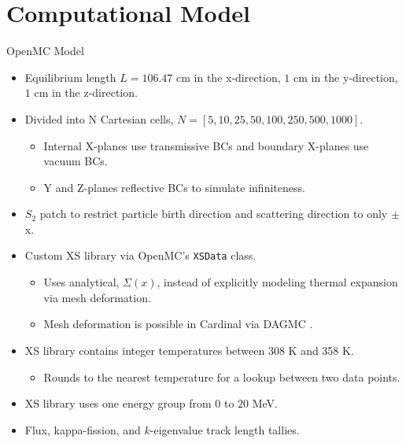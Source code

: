 \documentclass[9pt,t]{beamer}
\begin{document}
\section{Computational Model}
\begin{frame}{OpenMC Model}
    \pause
    \begin{itemize}
        \item <2-> Equilibrium length $L=106.47$ cm in the x-direction, $1$ cm in the y-direction, $1$ cm in the z-direction.
        \item <3-> Divided into N Cartesian cells, $N=[5, 10, 25, 50, 100, 250, 500, 1000]$.
        \begin{itemize}
            \item <4-> Internal X-planes use transmissive BCs and boundary X-planes use vacuum BCs.
            \item <5-> Y and Z-planes reflective BCs to simulate infiniteness.
        \end{itemize}
        \item <6-> $S_{2}$ patch to restrict particle birth direction and scattering direction to only $\pm$x.
        \item <7-> Custom XS library via OpenMC's \texttt{XSData} class.
        \begin{itemize}
            \item <8-> Uses analytical, $\Sigma(x)$, instead of explicitly modeling thermal expansion via mesh deformation.
            \item <9-> Mesh deformation is possible in Cardinal via DAGMC \cite{novak-2023}.
        \end{itemize}
        \item <10-> XS library contains integer temperatures between 308 K and 358 K.
        \begin{itemize}
            \item <11->Rounds to the nearest temperature for a lookup between two data points.
        \end{itemize}
        \item <12->XS library uses one energy group from $0$ to $20$ MeV.
        \item <13-> Flux, kappa-fission, and $k$-eigenvalue track length tallies.
    \end{itemize}
\end{frame}
\end{document}
